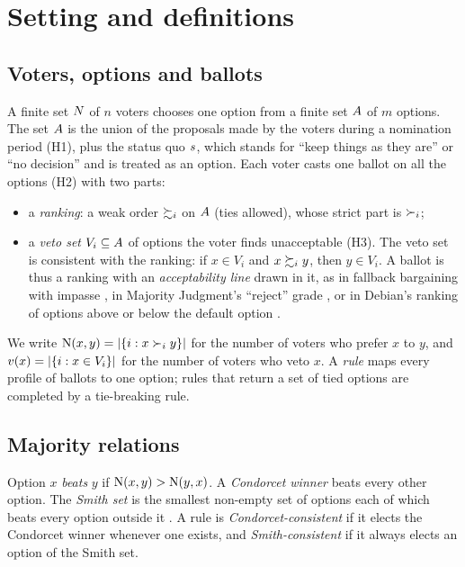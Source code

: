 \section{Setting and definitions}\label{sec:setting}

\subsection{Voters, options and ballots}

A finite set $N$ of $n$ voters chooses one option from a finite set $A$ of $m$ options. The
set $A$ is the union of the proposals made by the voters during a nomination period (H1), plus the
status quo $s$, which stands for ``keep things as they are'' or ``no decision'' and is treated as an
option. Each voter casts one ballot on all the options (H2) with two parts:
\begin{itemize}
  \item a \emph{ranking}: a weak order $\succsim_i$ on $A$ (ties allowed), whose strict part is
  $\succ_i$;
  \item a \emph{veto set} $V_i \subseteq A$ of options the voter finds unacceptable (H3). The veto
  set is consistent with the ranking: if $x \in V_i$ and $x \succsim_i y$, then $y \in V_i$. A ballot is
  thus a ranking with an \emph{acceptability line} drawn in it, as in fallback bargaining with
  impasse \citep{BramsKilgour2001}, in Majority Judgment's ``reject'' grade \citep{BalinskiLaraki2011},
  or in Debian's ranking of options above or below the default option \citep{Debian2024constitution}.
\end{itemize}
We write $\operatorname{N}(x,y) = |\{i : x \succ_i y\}|$ for the number of voters who prefer $x$ to $y$, and
$v(x) = |\{i : x \in V_i\}|$ for the number of voters who veto $x$. A \emph{rule} maps every
profile of ballots to one option; rules that return a set of tied options are completed by a
tie-breaking rule.

\subsection{Majority relations}

\begin{definition}\label{def:condorcet}
Option $x$ \emph{beats} $y$ if $\operatorname{N}(x,y) > \operatorname{N}(y,x)$. A \emph{Condorcet winner} beats every other
option. The \emph{Smith set} is the smallest non-empty set of options each of which beats every option
outside it \citep{Smith1973,Fishburn1977}. A rule is \emph{Condorcet-consistent} if it elects the
Condorcet winner whenever one exists, and \emph{Smith-consistent} if it always elects an option of the
Smith set.
\end{definition}

